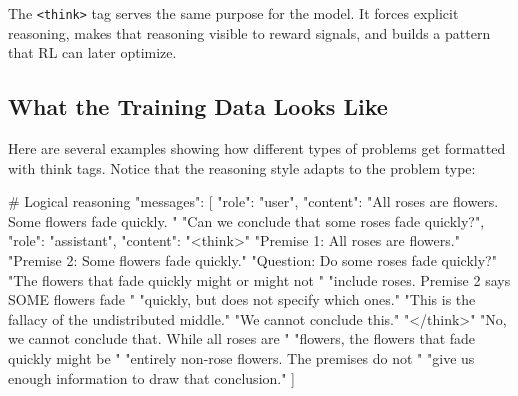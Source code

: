 \begin{chapterenv}
\begin{infobox}
The \texttt{<think>} tag serves the same purpose for the model. It forces explicit reasoning, makes that reasoning visible to reward signals, and builds a pattern that RL can later optimize.
\end{infobox}

\subsection{What the Training Data Looks Like}

Here are several examples showing how different types of problems get formatted with think tags. Notice that the reasoning style adapts to the problem type:


\begin{codeblock}[python]
# Logical reasoning
{
    "messages": [
        {"role": "user", "content":
         "All roses are flowers. Some flowers fade quickly. "
         "Can we conclude that some roses fade quickly?"},
        {"role": "assistant", "content":
         "<think>\n"
         "Premise 1: All roses are flowers.\n"
         "Premise 2: Some flowers fade quickly.\n"
         "Question: Do some roses fade quickly?\n"
         "The flowers that fade quickly might or might not "
         "include roses. Premise 2 says SOME flowers fade "
         "quickly, but does not specify which ones.\n"
         "This is the fallacy of the undistributed middle.\n"
         "We cannot conclude this.\n"
         "</think>\n"
         "No, we cannot conclude that. While all roses are "
         "flowers, the flowers that fade quickly might be "
         "entirely non-rose flowers. The premises do not "
         "give us enough information to draw that conclusion."}
    ]
}
\end{codeblock}


\end{chapterenv}

